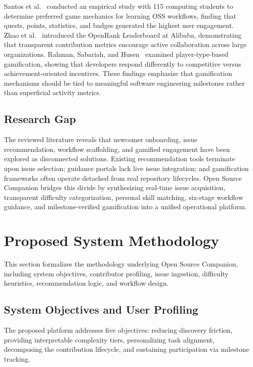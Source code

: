 \documentclass[conference]{IEEEtran}
\begin{document}
Santos et al.~\cite{santos2024game} conducted an empirical study with 115 computing students to determine preferred game mechanics for learning OSS workflows, finding that quests, points, statistics, and badges generated the highest user engagement. Zhao et al.~\cite{zhao2024openrank} introduced the OpenRank Leaderboard at Alibaba, demonstrating that transparent contribution metrics encourage active collaboration across large organizations. Rahman, Sabariah, and Husen~\cite{rahman2025impact} examined player-type-based gamification, showing that developers respond differently to competitive versus achievement-oriented incentives. These findings emphasize that gamification mechanisms should be tied to meaningful software engineering milestones rather than superficial activity metrics.

\subsection{Research Gap}
The reviewed literature reveals that newcomer onboarding, issue recommendation, workflow scaffolding, and gamified engagement have been explored as disconnected solutions. Existing recommendation tools terminate upon issue selection; guidance portals lack live issue integration; and gamification frameworks often operate detached from real repository lifecycles. Open Source Companion bridges this divide by synthesizing real-time issue acquisition, transparent difficulty categorization, personal skill matching, six-stage workflow guidance, and milestone-verified gamification into a unified operational platform.

\section{Proposed System Methodology}
This section formalizes the methodology underlying Open Source Companion, including system objectives, contributor profiling, issue ingestion, difficulty heuristics, recommendation logic, and workflow design.

\subsection{System Objectives and User Profiling}
The proposed platform addresses five objectives: reducing discovery friction, providing interpretable complexity tiers, personalizing task alignment, decomposing the contribution lifecycle, and sustaining participation via milestone tracking.
\end{document}
